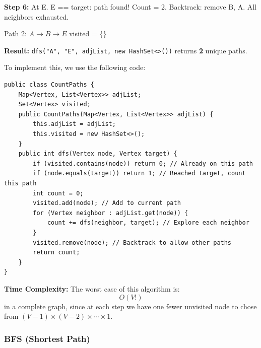 \textbf{Step 6:} At E. E == target: path found! Count = 2. Backtrack: remove B, A. All neighbors exhausted.

\begin{center}

{\small Path 2: $A \rightarrow B \rightarrow E$ \quad visited = \{\}}
\end{center}

\textbf{Result:} \texttt{dfs("A", "E", adjList, new HashSet<>())} returns \textbf{2} unique paths.

To implement this, we use the following code:

\begin{verbatim}
public class CountPaths {
    Map<Vertex, List<Vertex>> adjList;
    Set<Vertex> visited;
    public CountPaths(Map<Vertex, List<Vertex>> adjList) {
        this.adjList = adjList;
        this.visited = new HashSet<>();
    }
    public int dfs(Vertex node, Vertex target) {
        if (visited.contains(node)) return 0; // Already on this path
        if (node.equals(target)) return 1; // Reached target, count this path
        int count = 0;
        visited.add(node); // Add to current path
        for (Vertex neighbor : adjList.get(node)) {
            count += dfs(neighbor, target); // Explore each neighbor
        }
        visited.remove(node); // Backtrack to allow other paths
        return count;
    }
}
\end{verbatim}

\textbf{Time Complexity:} 
The worst case of this algorithm is:
\[
O(V!)
\]
in a complete graph, since at each step we have one fewer unvisited node to chose from $(V-1) \times (V-2) \times \cdots \times 1$.

\subsubsection{BFS (Shortest Path)}

